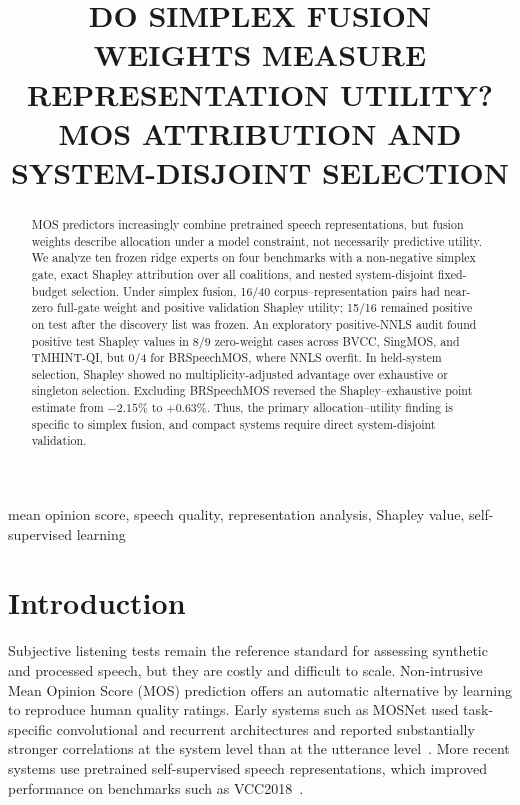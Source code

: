 \documentclass{article}
\title{DO SIMPLEX FUSION WEIGHTS MEASURE REPRESENTATION UTILITY?\\
MOS ATTRIBUTION AND SYSTEM-DISJOINT SELECTION}
\begin{document}
\ninept
\maketitle


\begin{abstract}
MOS predictors increasingly combine pretrained speech representations, but fusion weights describe allocation under a model constraint, not necessarily predictive utility. We analyze ten frozen ridge experts on four benchmarks with a non-negative simplex gate, exact Shapley attribution over all coalitions, and nested system-disjoint fixed-budget selection. Under simplex fusion, 16/40 corpus--representation pairs had near-zero full-gate weight and positive validation Shapley utility; 15/16 remained positive on test after the discovery list was frozen. An exploratory positive-NNLS audit found positive test Shapley values in 8/9 zero-weight cases across BVCC, SingMOS, and TMHINT-QI, but 0/4 for BRSpeechMOS, where NNLS overfit. In held-system selection, Shapley showed no multiplicity-adjusted advantage over exhaustive or singleton selection. Excluding BRSpeechMOS reversed the Shapley--exhaustive point estimate from $-2.15\%$ to $+0.63\%$. Thus, the primary allocation--utility finding is specific to simplex fusion, and compact systems require direct system-disjoint validation.
\end{abstract}



\begin{keywords}
mean opinion score, speech quality, representation analysis, Shapley value,
self-supervised learning
\end{keywords}

\section{Introduction}
\label{sec:intro}

Subjective listening tests remain the reference standard for assessing
synthetic and processed speech, but they are costly and difficult to scale.
Non-intrusive Mean Opinion Score (MOS) prediction offers an automatic
alternative by learning to reproduce human quality ratings. Early systems such
as MOSNet used task-specific convolutional and recurrent architectures and
reported substantially stronger correlations at the system level than at the
utterance level~\cite{lo2019mosnet}. More recent systems use pretrained
self-supervised speech representations, which improved performance on
benchmarks such as VCC2018~\cite{tseng2021sslmos}.
\end{document}
